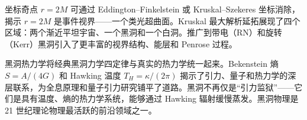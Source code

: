 坐标奇点 $r=2M$ 可通过 Eddington–Finkelstein 或 Kruskal–Szekeres 坐标消除，揭示 $r=2M$ 是事件视界——一个类光超曲面。Kruskal 最大解析延拓展现了四个区域：两个渐近平坦宇宙、一个黑洞和一个白洞。推广到带电（RN）和旋转（Kerr）黑洞引入了更丰富的视界结构、能层和 Penrose 过程。

黑洞热力学将经典黑洞力学四定律与真实的热力学统一起来。Bekenstein 熵 $S = A/(4G)$ 和 Hawking 温度 $T_H = \kappa/(2\pi)$ 揭示了引力、量子和热力学的深层联系，为全息原理和量子引力研究铺平了道路。黑洞不再仅是“引力监狱”——它们是具有温度、熵的热力学系统，能够通过 Hawking 辐射缓慢蒸发。黑洞物理是 21 世纪理论物理最活跃的前沿领域之一。
